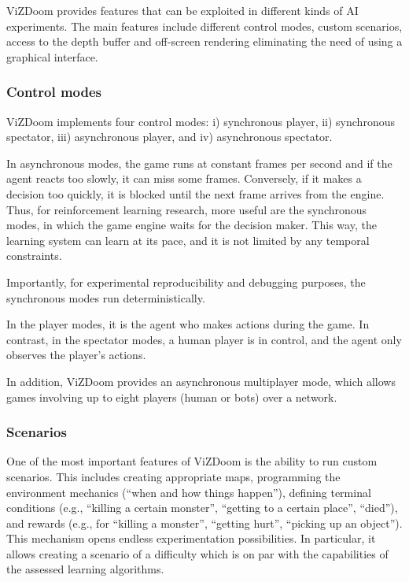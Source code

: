 \documentclass[english,american,conference, balance]{IEEEtran}
\begin{document}
ViZDoom provides features that can be exploited in different kinds
of AI experiments. The main features include different control modes,
custom scenarios, access to the depth buffer and off-screen rendering
eliminating the need of using a graphical interface.

\subsubsection{Control modes}

ViZDoom implements four control modes: i) synchronous player, ii)
synchronous spectator, iii) asynchronous player, and iv) asynchronous
spectator. 

In asynchronous modes, the game runs at constant  frames per
second and if the agent reacts too slowly, it can miss some frames.
Conversely, if it makes a decision too quickly, it is blocked until
the next frame arrives from the engine. Thus, for reinforcement learning
research, more useful are the synchronous modes, in which the game
engine waits for the decision maker. This way, the learning system
can learn at its pace, and it is not limited by any temporal constraints.

Importantly, for experimental reproducibility and debugging purposes,
the synchronous modes run deterministically.

In the player modes, it is the agent who makes actions during the
game. In contrast, in the spectator modes, a human player is in control,
and the agent only observes the player's actions.

In addition, ViZDoom provides an asynchronous multiplayer mode, which
allows games involving up to eight players (human or bots) over a
network.

\subsubsection{Scenarios}

One of the most important features of ViZDoom is the ability to run
custom scenarios. This includes creating appropriate maps, programming
the environment mechanics (``when and how things happen''), defining
terminal conditions (e.g., ``killing a certain monster'', ``getting
to a certain place'', ``died''), and rewards (e.g., for ``killing
a monster'', ``getting hurt'', ``picking up an object''). This
mechanism opens endless experimentation possibilities. In particular,
it allows creating a scenario of a difficulty which is on par with
the capabilities of the assessed learning algorithms.
\end{document}
